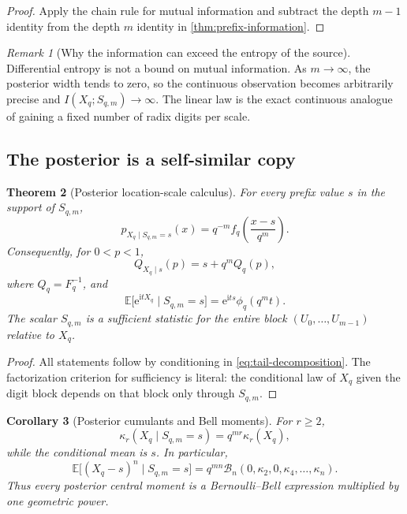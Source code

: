 \documentclass[11pt,oneside]{article}
\newtheorem{theorem}{Theorem}[section]
\newtheorem{corollary}[theorem]{Corollary}
\theoremstyle{definition}
\theoremstyle{remark}
\newtheorem{remark}[theorem]{Remark}
\newcommand{\E}{\mathbb E}
\newcommand{\ii}{\mathrm i}
\newcommand{\e}{\mathrm e}
\begin{document}
\begin{proof}
Apply the chain rule for mutual information and subtract the depth $m-1$ identity
from the depth $m$ identity in \cref{thm:prefix-information}.
\end{proof}

\begin{remark}[Why the information can exceed the entropy of the source]
Differential entropy is not a bound on mutual information.  As $m\to\infty$, the
posterior width tends to zero, so the continuous observation becomes arbitrarily
precise and $I(X_q;S_{q,m})\to\infty$.  The linear law is the exact continuous
analogue of gaining a fixed number of radix digits per scale.
\end{remark}

\subsection{The posterior is a self-similar copy}

\begin{theorem}[Posterior location-scale calculus]
\label{thm:posterior}
For every prefix value $s$ in the support of $S_{q,m}$,
\begin{equation}
 p_{X_q\mid S_{q,m}=s}(x)
 =q^{-m}f_q\!\left(\frac{x-s}{q^m}\right).
 \label{eq:posterior-density}
\end{equation}
Consequently, for $0<p<1$,
\begin{equation}
 Q_{X_q\mid s}(p)=s+q^mQ_q(p),
 \label{eq:posterior-quantile}
\end{equation}
where $Q_q=F_q^{-1}$, and
\begin{equation}
 \E\bigl[\e^{\ii tX_q}\mid S_{q,m}=s\bigr]
 =\e^{\ii ts}\phi_q(q^mt).
 \label{eq:posterior-cf}
\end{equation}
The scalar $S_{q,m}$ is a sufficient statistic for the entire block
$(U_0,\ldots,U_{m-1})$ relative to $X_q$.
\end{theorem}

\begin{proof}
All statements follow by conditioning in \eqref{eq:tail-decomposition}.  The
factorization criterion for sufficiency is literal: the conditional law of $X_q$
given the digit block depends on that block only through $S_{q,m}$.
\end{proof}

\begin{corollary}[Posterior cumulants and Bell moments]
\label{cor:posterior-cumulants}
For $r\ge2$,
\begin{equation}
 \kappa_r(X_q\mid S_{q,m}=s)=q^{mr}\kappa_r(X_q),
 \label{eq:posterior-cumulants}
\end{equation}
while the conditional mean is $s$.  In particular,
\begin{equation}
 \E\bigl[(X_q-s)^n\mid S_{q,m}=s\bigr]
 =q^{mn}\mathcal B_n(0,\kappa_2,0,\kappa_4,\ldots,\kappa_n).
 \label{eq:posterior-Bell}
\end{equation}
Thus every posterior central moment is a Bernoulli--Bell expression multiplied by
one geometric power.
\end{corollary}
\end{document}
